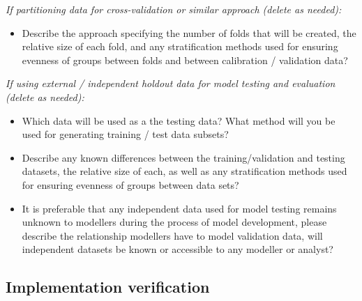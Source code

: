 \documentclass[
]{article}
\providecommand{\tightlist}{%
  \setlength{\itemsep}{0pt}\setlength{\parskip}{0pt}}
\begin{document}
\begin{tcolorbox}[enhanced jigsaw, opacitybacktitle=0.6, bottomrule=.15mm, leftrule=.75mm, rightrule=.15mm, colbacktitle=quarto-callout-caution-color!10!white, toprule=.15mm, titlerule=0mm, left=2mm, colframe=quarto-callout-caution-color-frame, breakable, title=\textcolor{quarto-callout-caution-color}{\faFire}\hspace{0.5em}{Preregistration Item}, opacityback=0, coltitle=black, bottomtitle=1mm, colback=white, toptitle=1mm, arc=.35mm]

\emph{If partitioning data for cross-validation or similar approach
(delete as needed):}

\begin{itemize}
\tightlist
\item[$\square$]
  Describe the approach specifying the number of folds that will be
  created, the relative size of each fold, and any stratification
  methods used for ensuring evenness of groups between folds and between
  calibration / validation data?
\end{itemize}

\emph{If using external / independent holdout data for model testing and
evaluation (delete as needed):}

\begin{itemize}
\tightlist
\item[$\square$]
  Which data will be used as a the testing data? What method will you be
  used for generating training / test data subsets?
\item[$\square$]
  Describe any known differences between the training/validation and
  testing datasets, the relative size of each, as well as any
  stratification methods used for ensuring evenness of groups between
  data sets?
\item[$\square$]
  It is preferable that any independent data used for model testing
  remains unknown to modellers during the process of model development,
  please describe the relationship modellers have to model validation
  data, will independent datasets be known or accessible to any modeller
  or analyst?
\end{itemize}

\end{tcolorbox}

\subsection{Implementation
verification}\label{implementation-verification}
\end{document}
